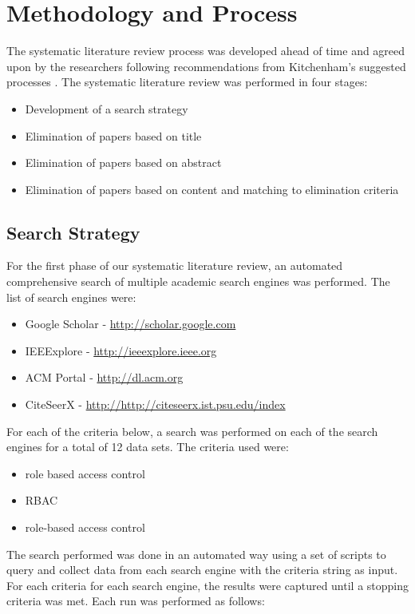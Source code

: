 \section{Methodology and Process} \label{sec:process}

The systematic literature review process was developed ahead of time and agreed upon by the researchers following recommendations from Kitchenham's suggested processes \cite{kitchenham2007guidelines}.  The systematic literature review was performed in four stages:

\begin{itemize}
\item Development of a search strategy
\item Elimination of papers based on title
\item Elimination of papers based on abstract
\item Elimination of papers based on content and matching to elimination criteria
\end{itemize}

\subsection{Search Strategy}

For the first phase of our systematic literature review, an automated comprehensive search of multiple academic search engines was performed. The list of search engines were:

\begin{itemize}
\item Google Scholar - \url{http://scholar.google.com}
\item IEEExplore - \url{http://ieeexplore.ieee.org}
\item ACM Portal - \url{http://dl.acm.org}
\item CiteSeerX - \url{http://http://citeseerx.ist.psu.edu/index}
\end{itemize}

For each of the criteria below, a search was performed on each of the search engines for a total of 12 data sets.  The criteria used were:
\begin{itemize}
\item role based access control
\item RBAC
\item role-based access control
\end{itemize}

The search performed was done in an automated way using a set of scripts to query and collect data from each search engine with the criteria string as input.  For each criteria for each search engine, the results were captured until a stopping criteria was met.  Each run was performed as follows:

